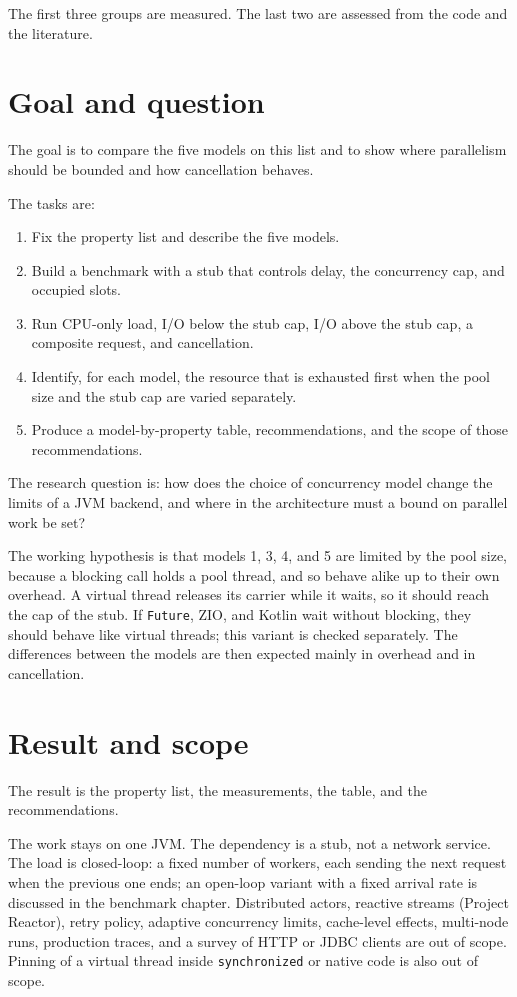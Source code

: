 The first three groups are measured. The last two are assessed from the code and the literature.

\section{Goal and question}

The goal is to compare the five models on this list and to show where parallelism should be bounded and how cancellation behaves.

The tasks are:

\begin{enumerate}
\item Fix the property list and describe the five models.
\item Build a benchmark with a stub that controls delay, the concurrency cap, and occupied slots.
\item Run CPU-only load, I/O below the stub cap, I/O above the stub cap, a composite request, and cancellation.
\item Identify, for each model, the resource that is exhausted first when the pool size and the stub cap are varied separately.
\item Produce a model-by-property table, recommendations, and the scope of those recommendations.
\end{enumerate}

The research question is: how does the choice of concurrency model change the limits of a JVM backend, and where in the architecture must a bound on parallel work be set?

The working hypothesis is that models 1, 3, 4, and 5 are limited by the pool size, because a blocking call holds a pool thread, and so behave alike up to their own overhead. A virtual thread releases its carrier while it waits, so it should reach the cap of the stub. If \texttt{Future}, ZIO, and Kotlin wait without blocking, they should behave like virtual threads; this variant is checked separately. The differences between the models are then expected mainly in overhead and in cancellation.

\section{Result and scope}

The result is the property list, the measurements, the table, and the recommendations.

The work stays on one JVM. The dependency is a stub, not a network service. The load is closed-loop: a fixed number of workers, each sending the next request when the previous one ends; an open-loop variant with a fixed arrival rate is discussed in the benchmark chapter. Distributed actors, reactive streams (Project Reactor), retry policy, adaptive concurrency limits, cache-level effects, multi-node runs, production traces, and a survey of HTTP or JDBC clients are out of scope. Pinning of a virtual thread inside \texttt{synchronized} or native code is also out of scope.

